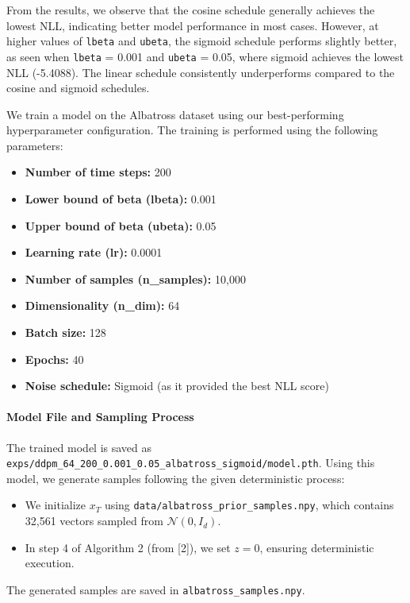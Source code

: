 \documentclass[a4paper,12pt]{article}
\begin{document}
From the results, we observe that the cosine schedule generally achieves the lowest NLL, indicating better model performance in most cases. However, at higher values of \texttt{lbeta} and \texttt{ubeta}, the sigmoid schedule performs slightly better, as seen when \texttt{lbeta} = 0.001 and \texttt{ubeta} = 0.05, where sigmoid achieves the lowest NLL (-5.4088). The linear schedule consistently underperforms compared to the cosine and sigmoid schedules. 



\clearpage
We train a model on the Albatross dataset using our best-performing hyperparameter configuration. The training is performed using the following parameters:

\begin{itemize}
    \item \textbf{Number of time steps:} 200
    \item \textbf{Lower bound of beta (lbeta):} 0.001
    \item \textbf{Upper bound of beta (ubeta):} 0.05
    \item \textbf{Learning rate (lr):} 0.0001
    \item \textbf{Number of samples (n\_samples):} 10,000
    \item \textbf{Dimensionality (n\_dim):} 64
    \item \textbf{Batch size:} 128
    \item \textbf{Epochs:} 40
    \item \textbf{Noise schedule:} Sigmoid (as it provided the best NLL score)
\end{itemize}

\paragraph{Model File and Sampling Process}  
The trained model is saved as 
\\
\texttt{exps/ddpm\_64\_200\_0.001\_0.05\_albatross\_sigmoid/model.pth}. Using this model, we generate samples following the given deterministic process:  
\begin{itemize}
    \item We initialize $x_T$ using \texttt{data/albatross\_prior\_samples.npy}, which contains 32,561 vectors sampled from $\mathcal{N}(0, I_d)$.
    \item In step 4 of Algorithm 2 (from [2]), we set $z = 0$, ensuring deterministic execution.
\end{itemize}  
The generated samples are saved in \texttt{albatross\_samples.npy}.  
\end{document}
